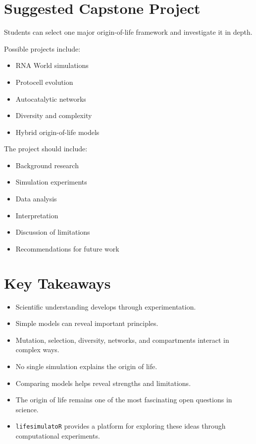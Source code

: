 \documentclass[
  oneside,
  openany]{book}
\providecommand{\tightlist}{%
  \setlength{\itemsep}{0pt}\setlength{\parskip}{0pt}}
\begin{document}
\section{Suggested Capstone Project}\label{suggested-capstone-project}

Students can select one major origin-of-life framework and investigate it in depth.

Possible projects include:

\begin{itemize}
\tightlist
\item
  RNA World simulations
\item
  Protocell evolution
\item
  Autocatalytic networks
\item
  Diversity and complexity
\item
  Hybrid origin-of-life models
\end{itemize}

The project should include:

\begin{itemize}
\tightlist
\item
  Background research
\item
  Simulation experiments
\item
  Data analysis
\item
  Interpretation
\item
  Discussion of limitations
\item
  Recommendations for future work
\end{itemize}

\section{Key Takeaways}\label{key-takeaways-6}

\begin{itemize}
\tightlist
\item
  Scientific understanding develops through experimentation.
\item
  Simple models can reveal important principles.
\item
  Mutation, selection, diversity, networks, and compartments interact in complex ways.
\item
  No single simulation explains the origin of life.
\item
  Comparing models helps reveal strengths and limitations.
\item
  The origin of life remains one of the most fascinating open questions in science.
\item
  \texttt{lifesimulatoR} provides a platform for exploring these ideas through computational experiments.
\end{itemize}
\end{document}
